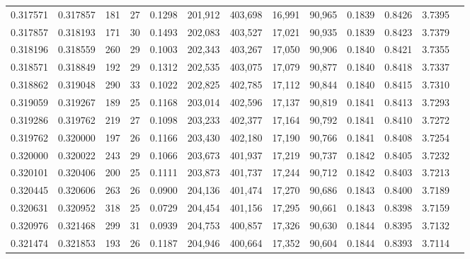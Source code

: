 \begin{tabular}{rrrrrrrrrrrrr}
0.317571 & 0.317857 &    181 &    27 &                                     0.1298 & 201,912 & 403,698 &  16,991 &  90,965 & 0.1839 & 0.8426 & 3.7395 \\
0.317857 & 0.318193 &    171 &    30 &                                     0.1493 & 202,083 & 403,527 &  17,021 &  90,935 & 0.1839 & 0.8423 & 3.7379 \\
0.318196 & 0.318559 &    260 &    29 &                                     0.1003 & 202,343 & 403,267 &  17,050 &  90,906 & 0.1840 & 0.8421 & 3.7355 \\
0.318571 & 0.318849 &    192 &    29 &                                     0.1312 & 202,535 & 403,075 &  17,079 &  90,877 & 0.1840 & 0.8418 & 3.7337 \\
0.318862 & 0.319048 &    290 &    33 &                                     0.1022 & 202,825 & 402,785 &  17,112 &  90,844 & 0.1840 & 0.8415 & 3.7310 \\
0.319059 & 0.319267 &    189 &    25 &                                     0.1168 & 203,014 & 402,596 &  17,137 &  90,819 & 0.1841 & 0.8413 & 3.7293 \\
0.319286 & 0.319762 &    219 &    27 &                                     0.1098 & 203,233 & 402,377 &  17,164 &  90,792 & 0.1841 & 0.8410 & 3.7272 \\
0.319762 & 0.320000 &    197 &    26 &                                     0.1166 & 203,430 & 402,180 &  17,190 &  90,766 & 0.1841 & 0.8408 & 3.7254 \\
0.320000 & 0.320022 &    243 &    29 &                                     0.1066 & 203,673 & 401,937 &  17,219 &  90,737 & 0.1842 & 0.8405 & 3.7232 \\
0.320101 & 0.320406 &    200 &    25 &                                     0.1111 & 203,873 & 401,737 &  17,244 &  90,712 & 0.1842 & 0.8403 & 3.7213 \\
0.320445 & 0.320606 &    263 &    26 &                                     0.0900 & 204,136 & 401,474 &  17,270 &  90,686 & 0.1843 & 0.8400 & 3.7189 \\
0.320631 & 0.320952 &    318 &    25 &                                     0.0729 & 204,454 & 401,156 &  17,295 &  90,661 & 0.1843 & 0.8398 & 3.7159 \\
0.320976 & 0.321468 &    299 &    31 &                                     0.0939 & 204,753 & 400,857 &  17,326 &  90,630 & 0.1844 & 0.8395 & 3.7132 \\
0.321474 & 0.321853 &    193 &    26 &                                     0.1187 & 204,946 & 400,664 &  17,352 &  90,604 & 0.1844 & 0.8393 & 3.7114 \\

\end{tabular}
